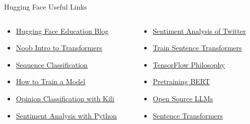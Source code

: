\documentclass{beamer}
\begin{document}
\begin{frame}{Hugging Face Useful Links}{}
    \begin{columns}
        \begin{column}{0.5\textwidth}
            \begin{itemize}
                \item \href{https://huggingface.co/blog/education}{\underline{Hugging Face Education Blog}}
                \item \href{https://huggingface.co/blog/noob_intro_transformers}{\underline{Noob Intro to Transformers}}
                \item \href{https://huggingface.co/docs/transformers/tasks/sequence_classification}{\underline{Sequence Classification}}
                \item \href{https://huggingface.co/blog/how-to-train}{\underline{How to Train a Model}}
                \item \href{https://huggingface.co/blog/opinion-classification-with-kili}{\underline{Opinion Classification with Kili}}
                \item \href{https://huggingface.co/blog/sentiment-analysis-python}{\underline{Sentiment Analysis with Python}}
            \end{itemize}
        \end{column}
        \begin{column}{0.5\textwidth}
            \begin{itemize}
                \item \href{https://huggingface.co/blog/sentiment-analysis-twitter}{\underline{Sentiment Analysis of Twitter}}
                \item \href{https://huggingface.co/blog/how-to-train-sentence-transformers}{\underline{Train Sentence Transformers}}
                \item \href{https://huggingface.co/blog/tensorflow-philosophy}{\underline{TensorFlow Philosophy}}
                \item \href{https://huggingface.co/blog/pretraining-bert}{\underline{Pretraining BERT}}
                \item \href{https://huggingface.co/blog/os-llms}{\underline{Open Source LLMs}}
                \item \href{https://huggingface.co/blog/train-sentence-transformers}{\underline{Sentence Transformers}}
            \end{itemize}
        \end{column}
    \end{columns}
\end{frame}
\end{document}
